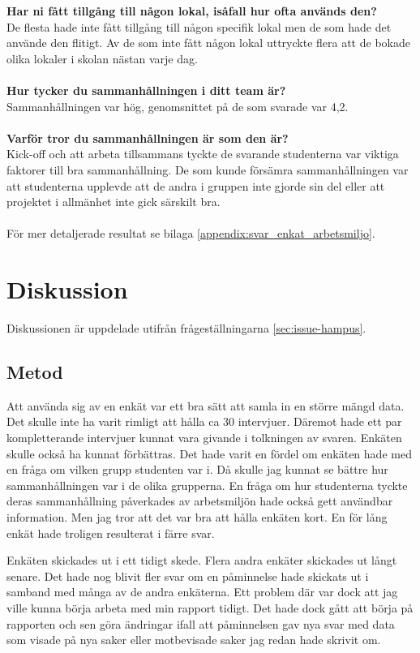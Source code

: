 \textbf{Har ni fått tillgång till någon lokal, isåfall hur ofta används den?}\\
De flesta hade inte fått tillgång till någon specifik lokal men de som hade det använde den flitigt. Av de som inte fått någon lokal uttryckte flera att de bokade olika lokaler i skolan nästan varje dag.\\\\
\textbf{Hur tycker du sammanhållningen i ditt team är?}\\
Sammanhållningen var hög, genomsnittet på de som svarade var 4,2.\\\\
\textbf{Varför tror du sammanhållningen är som den är?}\\
Kick-off och att arbeta tillsammans tyckte de svarande studenterna var viktiga faktorer till bra sammanhållning. De som kunde försämra sammanhållningen var att studenterna upplevde att de andra i gruppen inte gjorde sin del eller att projektet i allmänhet inte gick särskilt bra.\\\\
För mer detaljerade resultat se bilaga \ref{appendix:svar_enkat_arbetsmiljo}.

\section{Diskussion}
\label{sec:discussion-hampus}
Diskussionen är uppdelade utifrån frågeställningarna \ref{sec:issue-hampus}.

\subsection{Metod}
Att använda sig av en enkät var ett bra sätt att samla in en större mängd data. Det skulle inte ha varit rimligt att hålla ca 30 intervjuer. Däremot hade ett par kompletterande intervjuer kunnat vara givande i tolkningen av svaren. Enkäten skulle också ha kunnat förbättras. Det hade varit en fördel om enkäten hade med en fråga om vilken grupp studenten var i. Då skulle jag kunnat se bättre hur sammanhållningen var i de olika grupperna. En fråga om hur studenterna tyckte deras sammanhållning påverkades av arbetsmiljön hade också gett användbar information.	Men jag tror att det var bra att hålla enkäten kort. En för lång enkät hade troligen resulterat i färre svar. 

Enkäten skickades ut i ett tidigt skede. Flera andra enkäter skickades ut långt senare. Det hade nog blivit fler svar om en påminnelse hade skickats ut i samband med många av de andra enkäterna. Ett problem där var dock att jag ville kunna börja arbeta med min rapport tidigt. Det hade dock gått att börja på rapporten och sen göra ändringar ifall att påminnelsen gav nya svar med data som visade på nya saker eller motbevisade saker jag redan hade skrivit om. 

